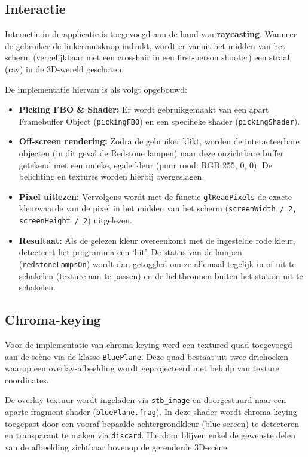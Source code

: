 \documentclass[11pt,a4paper]{article}
\begin{document}
\subsection{Interactie}
Interactie in de applicatie is toegevoegd aan de hand van \textbf{raycasting}. Wanneer de gebruiker de linkermuisknop indrukt, wordt er vanuit het midden van het scherm (vergelijkbaar met een crosshair in een first-person shooter) een straal (ray) in de 3D-wereld geschoten. 

De implementatie hiervan is als volgt opgebouwd:
\begin{itemize}
    \item \textbf{Picking FBO \& Shader:} Er wordt gebruikgemaakt van een apart Framebuffer Object (\texttt{pickingFBO}) en een specifieke shader (\texttt{pickingShader}).
    \item \textbf{Off-screen rendering:} Zodra de gebruiker klikt, worden de interacteerbare objecten (in dit geval de Redstone lampen) naar deze onzichtbare buffer getekend met een unieke, egale kleur (puur rood: RGB 255, 0, 0). De belichting en textures worden hierbij overgeslagen.
    \item \textbf{Pixel uitlezen:} Vervolgens wordt met de functie \texttt{glReadPixels} de exacte kleurwaarde van de pixel in het midden van het scherm (\texttt{screenWidth / 2, screenHeight / 2}) uitgelezen.
    \item \textbf{Resultaat:} Als de gelezen kleur overeenkomt met de ingestelde rode kleur, detecteert het programma een `hit'. De status van de lampen (\texttt{redstoneLampsOn}) wordt dan getoggled om ze allemaal tegelijk in of uit te schakelen (texture aan te passen) en de lichtbronnen buiten het station uit te schakelen.
\end{itemize}

\subsection{Chroma-keying}
Voor de implementatie van chroma-keying werd een textured quad toegevoegd aan de scène via de klasse \texttt{BluePlane}. Deze quad bestaat uit twee driehoeken waarop een overlay-afbeelding wordt geprojecteerd met behulp van texture coordinates.

De overlay-textuur wordt ingeladen via \texttt{stb\_image} en doorgestuurd naar een aparte fragment shader (\texttt{bluePlane.frag}). In deze shader wordt chroma-keying toegepast door een vooraf bepaalde achtergrondkleur (blue-screen) te detecteren en transparant te maken via \texttt{discard}. Hierdoor blijven enkel de gewenste delen van de afbeelding zichtbaar bovenop de gerenderde 3D-scène.
\end{document}
